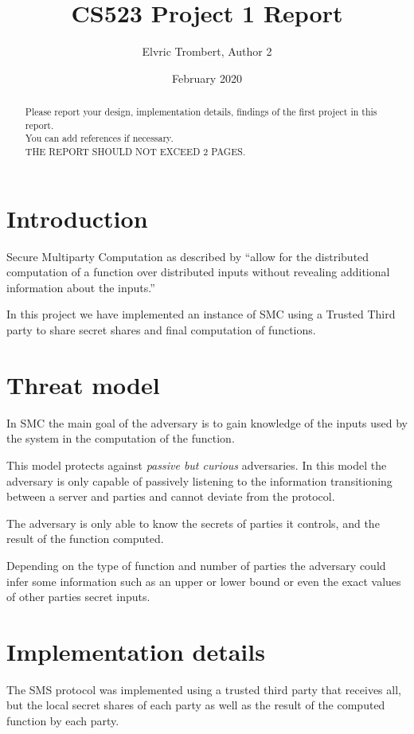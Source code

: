 \documentclass[10pt,conference,compsocconf]{IEEEtran}
\title{CS523 Project 1 Report}
\author{Elvric Trombert, Author 2}
\date{February 2020}
\begin{document}
\maketitle

\begin{abstract}
    Please report your design, implementation details, findings of the first project in this report. \\
    You can add references if necessary. \\
    THE REPORT SHOULD NOT EXCEED 2 PAGES.
\end{abstract}

\section{Introduction}
Secure Multiparty Computation as described by \cite[Frikken]{Frikken2011} \enquote{allow for the distributed computation of a
function over distributed inputs without revealing additional information about the inputs.}

In this project we have implemented an instance of SMC using a Trusted Third party to share secret shares and final
computation of functions.

\section{Threat model}
In SMC the main goal of the adversary is to gain knowledge of the inputs used by the system in the computation of
the function.

This model protects against \textit{passive but curious} adversaries.
In this model the adversary is only capable of passively listening to the information transitioning between a server and
parties and cannot deviate from the protocol.

The adversary is only able to know the secrets of parties it controls, and the result of the function computed.

Depending on the type of function and number of parties the adversary could infer some information such as an
upper or lower bound or even the exact values of other parties secret inputs.

\section{Implementation details}
The SMS protocol was implemented using a trusted third party that receives all, but the local secret shares of each party
as well as the result of the computed function by each party.
\end{document}
